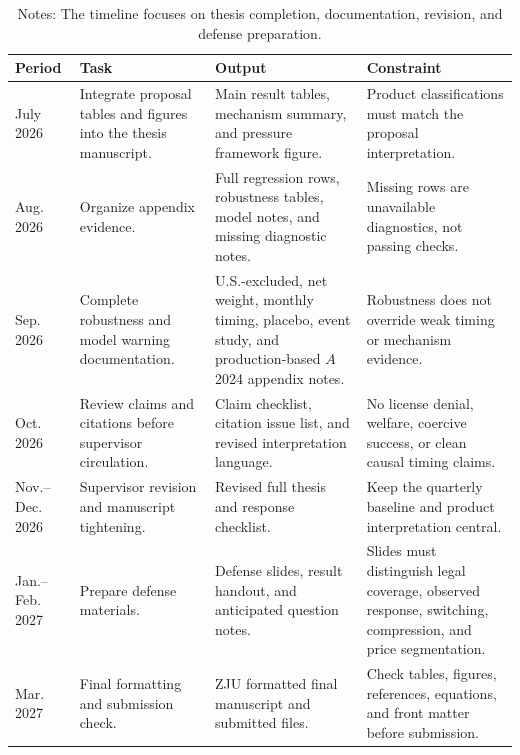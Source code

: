 \begin{table}[H]
\caption{Thesis Completion Timeline}
\label{tab:timeline}
\centering
\begingroup
\scriptsize
\setlength{\tabcolsep}{3pt}
\renewcommand{\arraystretch}{1.05}
\begin{tabularx}{\textwidth}{>{\raggedright\arraybackslash}p{}>{\raggedright\arraybackslash}p{}>{\raggedright\arraybackslash}p{}>{\raggedright\arraybackslash}X}
\toprule
Period & Task & Output & Constraint \\
\midrule
July 2026 & Integrate proposal tables and figures into the thesis manuscript. & Main result tables, mechanism summary, and pressure framework figure. & Product classifications must match the proposal interpretation. \\
Aug. 2026 & Organize appendix evidence. & Full regression rows, robustness tables, model notes, and missing diagnostic notes. & Missing rows are unavailable diagnostics, not passing checks. \\
Sep. 2026 & Complete robustness and model warning documentation. & U.S.-excluded, net weight, monthly timing, placebo, event study, and production-based \(A\) 2024 appendix notes. & Robustness does not override weak timing or mechanism evidence. \\
Oct. 2026 & Review claims and citations before supervisor circulation. & Claim checklist, citation issue list, and revised interpretation language. & No license denial, welfare, coercive success, or clean causal timing claims. \\
Nov.--Dec. 2026 & Supervisor revision and manuscript tightening. & Revised full thesis and response checklist. & Keep the quarterly baseline and product interpretation central. \\
Jan.--Feb. 2027 & Prepare defense materials. & Defense slides, result handout, and anticipated question notes. & Slides must distinguish legal coverage, observed response, switching, compression, and price segmentation. \\
Mar. 2027 & Final formatting and submission check. & ZJU formatted final manuscript and submitted files. & Check tables, figures, references, equations, and front matter before submission. \\
\bottomrule
\end{tabularx}
\caption*{\footnotesize Notes: The timeline focuses on thesis completion, documentation, revision, and defense preparation.}
\endgroup
\end{table}
